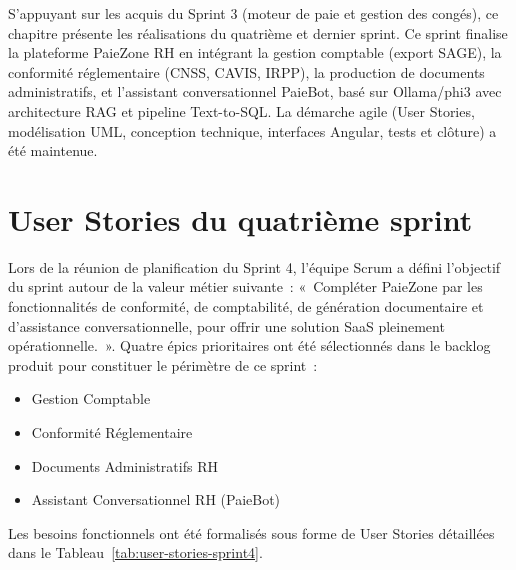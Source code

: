S'appuyant sur les acquis du Sprint 3 (moteur de paie et gestion des congés),
 ce chapitre présente les réalisations du quatrième et dernier sprint.
  Ce sprint finalise la plateforme PaieZone RH en intégrant la gestion 
  comptable (export SAGE), la conformité réglementaire (CNSS, CAVIS, IRPP), 
  la production de documents administratifs, et l'assistant conversationnel
   PaieBot, basé sur Ollama/phi3 avec architecture RAG et pipeline Text-to-SQL.
    La démarche agile (User Stories, modélisation UML, conception technique,
     interfaces Angular, tests et clôture) a été maintenue.

\section{User Stories du quatrième sprint}
\label{sec:s4-userstories}

Lors de la réunion de planification du Sprint 4, l'équipe Scrum a défini
l'objectif du sprint autour de la valeur métier suivante~:
«~Compléter PaieZone par les fonctionnalités de conformité, de
comptabilité, de génération documentaire et d'assistance
conversationnelle, pour offrir une solution SaaS pleinement
opérationnelle.~». Quatre épics prioritaires ont été sélectionnés
dans le backlog produit pour constituer le périmètre de ce sprint~:

\begin{itemize}[label=\textbullet, leftmargin=0.6cm]
    \item Gestion Comptable
    \item Conformité Réglementaire
    \item Documents Administratifs RH
    \item Assistant Conversationnel RH (PaieBot)
\end{itemize}

Les besoins fonctionnels ont été formalisés sous forme de User Stories
détaillées dans le Tableau~\ref{tab:user-stories-sprint4}.

